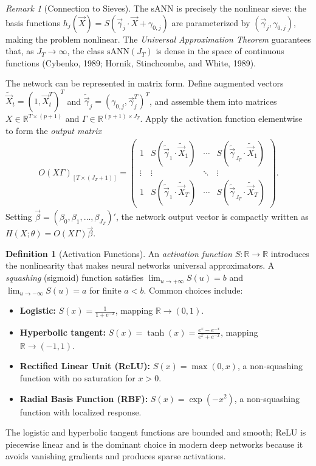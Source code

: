 \documentclass[11pt]{article}
\theoremstyle{definition}
\newtheorem{definition}{Definition}[section]
\theoremstyle{plain}
\theoremstyle{remark}
\newtheorem{remark}{Remark}[section]
\begin{document}
\begin{remark}[Connection to Sieves]
    The sANN is precisely the nonlinear sieve: the basis functions $h_j(\vec{X}) = S(\vec{\gamma}_j\cdot\vec{X} + \gamma_{0,j})$ are parameterized by $(\vec{\gamma}_j, \gamma_{0,j})$, making the problem nonlinear. The \textit{Universal Approximation Theorem} guarantees that, as $J_T \to \infty$, the class $\mathrm{sANN}(J_T)$ is dense in the space of continuous functions (Cybenko, 1989; Hornik, Stinchcombe, and White, 1989).
\end{remark}

The network can be represented in matrix form. Define augmented vectors $\widetilde{\vec{X}}_t = (1, \vec{X}_t^T)^T$ and $\widetilde{\vec{\gamma}}_j = (\gamma_{0,j}, \vec{\gamma}_j^T)^T$, and assemble them into matrices $X \in \mathbb{R}^{T \times (p+1)}$ and $\Gamma \in \mathbb{R}^{(p+1) \times J_T}$. Apply the activation function elementwise to form the \emph{output matrix}
\begin{align}
    O(X\Gamma)_{[T \times (J_T+1)]} =
    \begin{pmatrix}
        1 & S(\widetilde{\vec{\gamma}}_1\cdot\widetilde{\vec{X}}_1) & \cdots & S(\widetilde{\vec{\gamma}}_{J_T}\cdot\widetilde{\vec{X}}_1) \\
        \vdots & \vdots & \ddots & \vdots \\
        1 & S(\widetilde{\vec{\gamma}}_1\cdot\widetilde{\vec{X}}_T) & \cdots & S(\widetilde{\vec{\gamma}}_{J_T}\cdot\widetilde{\vec{X}}_T)
    \end{pmatrix}.
\end{align}
Setting $\vec{\beta} = (\beta_0, \beta_1, \ldots, \beta_{J_T})'$, the network output vector is compactly written as $H(X;\theta) = O(X\Gamma)\vec{\beta}$.

\begin{definition}[Activation Functions]
    An \textit{activation function} $S : \mathbb{R} \to \mathbb{R}$ introduces the nonlinearity that makes neural networks universal approximators. A \emph{squashing} (sigmoid) function satisfies $\lim_{u \to +\infty} S(u) = b$ and $\lim_{u \to -\infty} S(u) = a$ for finite $a < b$. Common choices include:
    \begin{itemize}[noitemsep]
        \item \textbf{Logistic:} $S(x) = \frac{1}{1 + e^{-x}}$, mapping $\mathbb{R} \to (0,1)$.
        \item \textbf{Hyperbolic tangent:} $S(x) = \tanh(x) = \frac{e^x - e^{-x}}{e^x + e^{-x}}$, mapping $\mathbb{R} \to (-1,1)$.
        \item \textbf{Rectified Linear Unit (ReLU):} $S(x) = \max(0,x)$, a non-squashing function with no saturation for $x > 0$.
        \item \textbf{Radial Basis Function (RBF):} $S(x) = \exp(-x^2)$, a non-squashing function with localized response.
    \end{itemize}
    The logistic and hyperbolic tangent functions are bounded and smooth; ReLU is piecewise linear and is the dominant choice in modern deep networks because it avoids vanishing gradients and produces sparse activations.
\end{definition}
\end{document}
